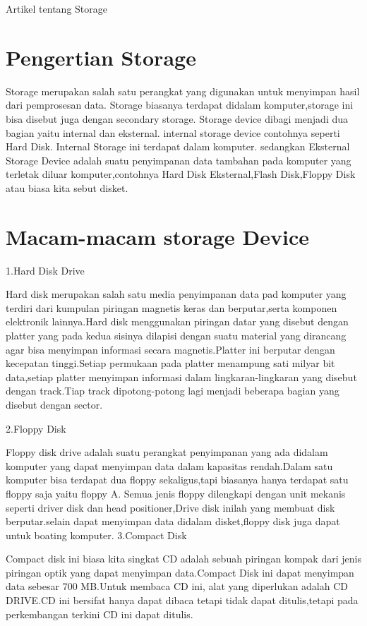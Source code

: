 






Artikel tentang Storage





\section{Pengertian Storage}
Storage merupakan salah satu perangkat yang digunakan untuk menyimpan hasil dari pemprosesan data. Storage biasanya terdapat didalam komputer,storage ini bisa disebut juga dengan secondary storage.
Storage device dibagi menjadi dua bagian yaitu internal dan eksternal. internal storage device contohnya seperti Hard Disk. Internal Storage ini terdapat dalam komputer. sedangkan Eksternal Storage Device adalah suatu penyimpanan data tambahan pada komputer yang terletak diluar komputer,contohnya Hard Disk Eksternal,Flash Disk,Floppy Disk atau biasa kita sebut disket.
\section{Macam-macam storage Device}

1.Hard Disk Drive

Hard disk merupakan salah satu media penyimpanan data pad komputer yang terdiri dari kumpulan piringan magnetis keras dan berputar,serta komponen elektronik lainnya.Hard disk menggunakan piringan datar yang disebut dengan platter yang pada kedua sisinya dilapisi dengan suatu material yang dirancang agar bisa menyimpan informasi secara magnetis.Platter ini berputar dengan kecepatan tinggi.Setiap permukaan pada platter menampung sati milyar bit data,setiap platter menyimpan informasi dalam lingkaran-lingkaran yang disebut dengan track.Tiap track dipotong-potong lagi menjadi beberapa bagian yang disebut dengan sector.

2.Floppy Disk

Floppy disk drive adalah suatu perangkat penyimpanan yang ada didalam komputer yang dapat menyimpan data dalam kapasitas rendah.Dalam satu komputer bisa terdapat dua floppy sekaligus,tapi biasanya hanya terdapat satu floppy saja yaitu floppy A. Semua jenis floppy dilengkapi dengan unit mekanis seperti driver disk dan head positioner,Drive disk inilah yang membuat disk berputar.selain dapat menyimpan data didalam disket,floppy disk juga dapat untuk boating komputer.
3.Compact Disk

Compact disk ini biasa kita singkat CD adalah sebuah piringan kompak dari jenis piringan optik yang dapat menyimpan data.Compact Disk ini dapat menyimpan data sebesar 700 MB.Untuk membaca CD ini, alat yang diperlukan adalah CD DRIVE.CD ini bersifat hanya dapat dibaca tetapi tidak dapat ditulis,tetapi pada perkembangan terkini CD ini dapat ditulis.